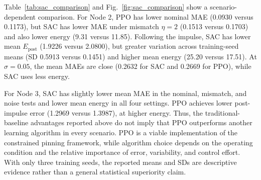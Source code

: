 Table~\ref{tab:sac_comparison} and Fig.~\ref{fig:sac_comparison} show a scenario-dependent comparison. For Node 2, PPO has lower nominal MAE (0.0930 versus 0.1173), but SAC has lower MAE under mismatch $\eta=2$ (0.1513 versus 0.1703) and also lower energy (9.31 versus 11.85). Following the impulse, SAC has lower mean $E_{\mathrm{post}}$ (1.9226 versus 2.0800), but greater variation across training-seed means (SD 0.5913 versus 0.1451) and higher mean energy (25.20 versus 17.51). At $\sigma=0.05$, the mean MAEs are close (0.2632 for SAC and 0.2669 for PPO), while SAC uses less energy.

For Node 3, SAC has slightly lower mean MAE in the nominal, mismatch, and noise tests and lower mean energy in all four settings. PPO achieves lower post-impulse error (1.2969 versus 1.3987), at higher energy. Thus, the traditional-baseline advantages reported above do not imply that PPO outperforms another learning algorithm in every scenario. PPO is a viable implementation of the constrained pinning framework, while algorithm choice depends on the operating condition and the relative importance of error, variability, and control effort. With only three training seeds, the reported means and SDs are descriptive evidence rather than a general statistical superiority claim.
